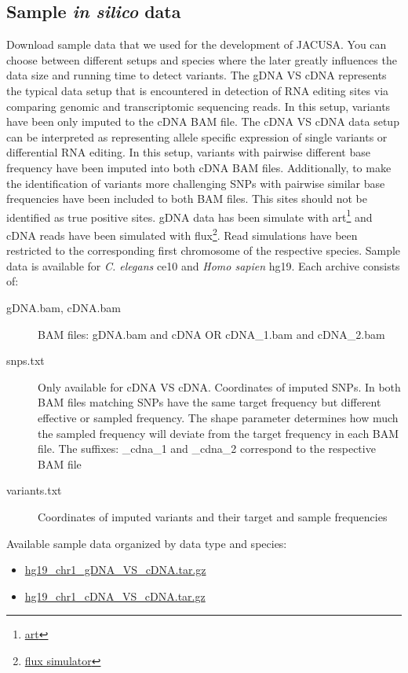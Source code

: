 \documentclass[10pt, a4paper]{article}
\begin{document}
\subsection{Sample \textit{in silico} data}
Download sample data that we used for the development of JACUSA. You can choose between different
setups and species where the later greatly influences the data size and running time to detect
variants. The gDNA VS cDNA represents the typical data setup that is encountered in detection of RNA
editing sites via comparing genomic and transcriptomic sequencing reads. In this setup, variants
have been only imputed to the cDNA BAM file. The cDNA VS cDNA data setup can be interpreted as
representing allele specific expression of single variants or differential RNA editing. In this
setup, variants with pairwise different base frequency have been imputed into both cDNA BAM files.
Additionally, to make the identification of variants more challenging SNPs with pairwise similar base
frequencies have been included to both BAM files. This sites should not be identified as true
positive sites.
gDNA data has been simulate with
art\footnote{\href{http://www.niehs.nih.gov/research/resources/software/biostatistics/art/}{art}}
and cDNA reads have been simulated with
flux\footnote{\href{http://sammeth.net/confluence/display/SIM/Home}{flux simulator}}. Read
simulations have been restricted to the corresponding first chromosome of the respective species.
Sample data is available for \textit{C. elegans} ce10 and \textit{Homo sapien} hg19. Each archive
consists of:
\begin{description}
  \item[gDNA.bam, cDNA.bam] BAM files: gDNA.bam and cDNA OR cDNA\_1.bam and cDNA\_2.bam
  \item[snps.txt] Only available for cDNA VS cDNA. Coordinates of imputed SNPs. In both
  BAM files matching SNPs have the same target frequency but different effective or sampled
  frequency. The shape parameter determines how much the sampled frequency will deviate from the
  target frequency in each BAM file. The suffixes: \_cdna\_1 and \_cdna\_2 correspond to the
  respective BAM file
  \item[variants.txt] Coordinates of imputed variants and their target and sample
  frequencies
\end{description}
Available sample data organized by data type and species:
\begin{itemize}
  \item
  \href{http://www.age.mpg.com/software/jacusa/sample_data/hg19_chr1_gDNA_VS_cDNA.tar.gz}{hg19\_chr1\_gDNA\_VS\_cDNA.tar.gz}
  \item
  \href{http://www.age.mpg.com/software/jacusa/sample_data/hg19_chr1_cDNA_VS_cDNA.tar.gz}{hg19\_chr1\_cDNA\_VS\_cDNA.tar.gz}
\end{itemize}
\end{document}
